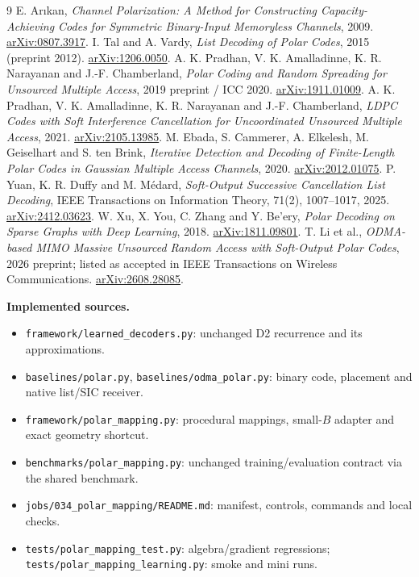 \documentclass[10pt,a4paper]{article}
\begin{document}
\begin{thebibliography}{9}
\setlength{\itemsep}{0.5em}
 E. Ar\i kan, \emph{Channel Polarization: A Method for Constructing Capacity-Achieving Codes for
Symmetric Binary-Input Memoryless Channels}, 2009. \href{https://arxiv.org/abs/0807.3917}{arXiv:0807.3917}.
 I. Tal and A. Vardy, \emph{List Decoding of Polar Codes}, 2015 (preprint 2012).
\href{https://arxiv.org/abs/1206.0050}{arXiv:1206.0050}.
 A. K. Pradhan, V. K. Amalladinne, K. R. Narayanan and J.-F. Chamberland,
\emph{Polar Coding and Random Spreading for Unsourced Multiple Access}, 2019 preprint / ICC 2020.
\href{https://arxiv.org/abs/1911.01009}{arXiv:1911.01009}.
 A. K. Pradhan, V. K. Amalladinne, K. R. Narayanan and J.-F. Chamberland,
\emph{LDPC Codes with Soft Interference Cancellation for Uncoordinated Unsourced Multiple Access}, 2021.
\href{https://arxiv.org/abs/2105.13985}{arXiv:2105.13985}.
 M. Ebada, S. Cammerer, A. Elkelesh, M. Geiselhart and S. ten Brink,
\emph{Iterative Detection and Decoding of Finite-Length Polar Codes in Gaussian Multiple Access Channels}, 2020.
\href{https://arxiv.org/abs/2012.01075}{arXiv:2012.01075}.
 P. Yuan, K. R. Duffy and M. M\'edard, \emph{Soft-Output Successive Cancellation List Decoding},
IEEE Transactions on Information Theory, 71(2), 1007--1017, 2025.
\href{https://arxiv.org/abs/2412.03623}{arXiv:2412.03623}.
 W. Xu, X. You, C. Zhang and Y. Be'ery,
\emph{Polar Decoding on Sparse Graphs with Deep Learning}, 2018.
\href{https://arxiv.org/abs/1811.09801}{arXiv:1811.09801}.
 T. Li et al., \emph{ODMA-based MIMO Massive Unsourced Random Access with Soft-Output Polar Codes},
2026 preprint; listed as accepted in IEEE Transactions on Wireless Communications.
\href{https://arxiv.org/abs/2608.28085}{arXiv:2608.28085}.
\end{thebibliography}

\textbf{Implemented sources.}
\begin{itemize}
\item \texttt{framework/learned\_decoders.py}: unchanged D2 recurrence and its approximations.
\item \texttt{baselines/polar.py}, \texttt{baselines/odma\_polar.py}: binary code, placement and native list/SIC receiver.
\item \texttt{framework/polar\_mapping.py}: procedural mappings, small-$B$ adapter and exact geometry shortcut.
\item \texttt{benchmarks/polar\_mapping.py}: unchanged training/evaluation contract via the shared benchmark.
\item \texttt{jobs/034\_polar\_mapping/README.md}: manifest, controls, commands and local checks.
\item \texttt{tests/polar\_mapping\_test.py}: algebra/gradient regressions;
      \texttt{tests/polar\_mapping\_learning.py}: smoke and mini runs.
\end{itemize}
\end{document}
